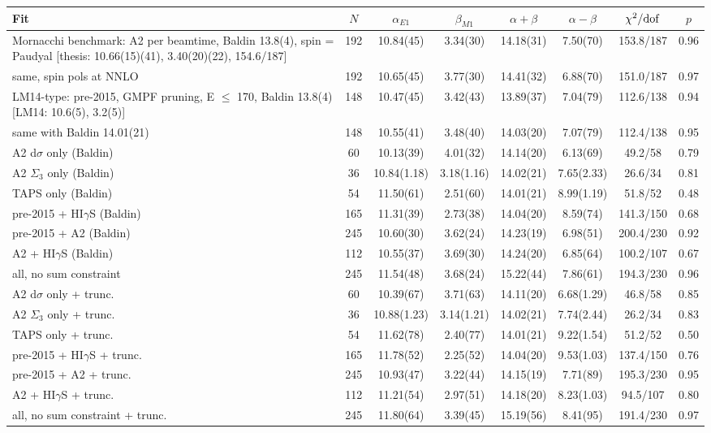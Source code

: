\begin{tabular}{lccccccc}
\hline
Fit & $N$ & $\alpha_{E1}$ & $\beta_{M1}$ & $\alpha+\beta$ & $\alpha-\beta$ & $\chi^2/{\rm dof}$ & $p$ \\
\hline
Mornacchi benchmark: A2 per beamtime, Baldin 13.8(4), spin = Paudyal [thesis: 10.66(15)(41), 3.40(20)(22), 154.6/187] & 192 & 10.84(45) & 3.34(30) & 14.18(31) & 7.50(70) & 153.8/187 & 0.96 \\
same, spin pols at NNLO & 192 & 10.65(45) & 3.77(30) & 14.41(32) & 6.88(70) & 151.0/187 & 0.97 \\
LM14-type: pre-2015, GMPF pruning, E $\le$ 170, Baldin 13.8(4) [LM14: 10.6(5), 3.2(5)] & 148 & 10.47(45) & 3.42(43) & 13.89(37) & 7.04(79) & 112.6/138 & 0.94 \\
same with Baldin 14.01(21) & 148 & 10.55(41) & 3.48(40) & 14.03(20) & 7.07(79) & 112.4/138 & 0.95 \\
A2 d$\sigma$ only (Baldin) & 60 & 10.13(39) & 4.01(32) & 14.14(20) & 6.13(69) & 49.2/58 & 0.79 \\
A2 $\Sigma_3$ only (Baldin) & 36 & 10.84(1.18) & 3.18(1.16) & 14.02(21) & 7.65(2.33) & 26.6/34 & 0.81 \\
TAPS only (Baldin) & 54 & 11.50(61) & 2.51(60) & 14.01(21) & 8.99(1.19) & 51.8/52 & 0.48 \\
pre-2015 + HI$\gamma$S (Baldin) & 165 & 11.31(39) & 2.73(38) & 14.04(20) & 8.59(74) & 141.3/150 & 0.68 \\
pre-2015 + A2 (Baldin) & 245 & 10.60(30) & 3.62(24) & 14.23(19) & 6.98(51) & 200.4/230 & 0.92 \\
A2 + HI$\gamma$S (Baldin) & 112 & 10.55(37) & 3.69(30) & 14.24(20) & 6.85(64) & 100.2/107 & 0.67 \\
all, no sum constraint & 245 & 11.54(48) & 3.68(24) & 15.22(44) & 7.86(61) & 194.3/230 & 0.96 \\
A2 d$\sigma$ only + trunc. & 60 & 10.39(67) & 3.71(63) & 14.11(20) & 6.68(1.29) & 46.8/58 & 0.85 \\
A2 $\Sigma_3$ only + trunc. & 36 & 10.88(1.23) & 3.14(1.21) & 14.02(21) & 7.74(2.44) & 26.2/34 & 0.83 \\
TAPS only + trunc. & 54 & 11.62(78) & 2.40(77) & 14.01(21) & 9.22(1.54) & 51.2/52 & 0.50 \\
pre-2015 + HI$\gamma$S + trunc. & 165 & 11.78(52) & 2.25(52) & 14.04(20) & 9.53(1.03) & 137.4/150 & 0.76 \\
pre-2015 + A2 + trunc. & 245 & 10.93(47) & 3.22(44) & 14.15(19) & 7.71(89) & 195.3/230 & 0.95 \\
A2 + HI$\gamma$S + trunc. & 112 & 11.21(54) & 2.97(51) & 14.18(20) & 8.23(1.03) & 94.5/107 & 0.80 \\
all, no sum constraint + trunc. & 245 & 11.80(64) & 3.39(45) & 15.19(56) & 8.41(95) & 191.4/230 & 0.97 \\
\hline
\end{tabular}
